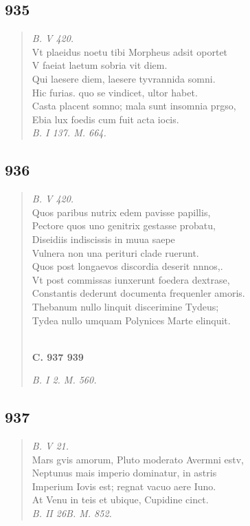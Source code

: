 \documentclass[11pt, a4paper]{report}
\begin{document}
            \subsection*{935}
      \begin{verse}
      \textit{B. V 420.} \\ Vt plaeidus noetu tibi Morpheus adsit oportet \\ V faeiat laetum sobria vit diem. \\ Qui laesere diem, laesere tyvrannida somni. \\ Hic furias. quo se vindicet, ultor habet. \\ Casta placent somno; mala sunt insomnia prgso, \\ Ebia lux foedis cum fuit acta iocis. \\ \textit{B. I 137. M. 664.} \\ 
      \end{verse}
  
            \subsection*{936}
      \begin{verse}
      \textit{B. V 420.} \\ Quos paribus nutrix edem pavisse papillis, \\ Pectore quos uno genitrix gestasse probatu, \\ Diseidiis indiscissis in muua saepe \\ Vulnera non una perituri clade ruerunt. \\ Quos post longaevos discordia deserit nnnos,. \\ Vt post commissas iunxerunt foedera dextrase, \\ Constantis dederunt documenta frequenler amoris. \\ Thebanum nullo linquit discerimine Tydeus; \\ Tydea nullo umquam Polynices Marte elinquit. \\ 
        ﻿\pagebreak 
     \marginpar{[360]} \begin{center} \textbf{C. 937 939} \end{center}\textit{B. I 2. M. 560.} \\ 
      \end{verse}
  
            \subsection*{937}
      \begin{verse}
      \textit{B. V 21.} \\ Mars gvis amorum, Pluto moderato Avermni estv, \\ Neptunus mais imperio dominatur, in astris \\ Imperium Iovis est; regnat vacuo aere Iuno. \\ At Venu in teis et ubique, Cupidine cinct. \\ \textit{B. II 26B. M. 852.} \\ 
      \end{verse}
  
\end{document}
